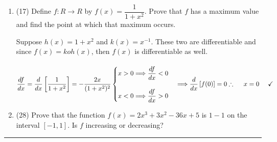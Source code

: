 \documentclass[fleqn]{article}
\begin{document}
\begin{enumerate}
    \item (17) Define $f: R \longrightarrow R$ by $f(x)=\dfrac{1}{1+x^2}$. Prove that $f$ has a maximum value and find the
    point at which that maximum occurs.

      \textcolor{hwColor}{
        Suppose $h(x)=1+x^2$ and $k(x)=x^{-1}$. These two are differentiable and since $f(x)=koh(x)$, then $f(x)$ is differentiable as well.
        \\
        \\
        $
          \dfrac{df}{dx}=\dfrac{d}{dx} \left[\dfrac{1}{1+x^2}\right]=-\dfrac{2x}{(1+x^2)^2}
          \\
          \\
          \\
          \begin{cases}
            x>0 \Longrightarrow \dfrac{df}{dx} <0
            \\
            \\
            x<0 \Longrightarrow \dfrac{df}{dx} >0
          \end{cases} \Longrightarrow \dfrac{d}{dx} \left[f(0)\right]=0
          \\
          \\
          \\
          \therefore ~~~~ x=0 ~~~~ \checkmark
        $
      }

    \item (28) Prove that the function $f(x)=2x^3+3x^2-36x+5$ is $1-1$ on the interval $[-1,1]$. Is $f$ increasing or decreasing?



  \end{enumerate}

  \rule{15cm}{1pt}
\end{document}
